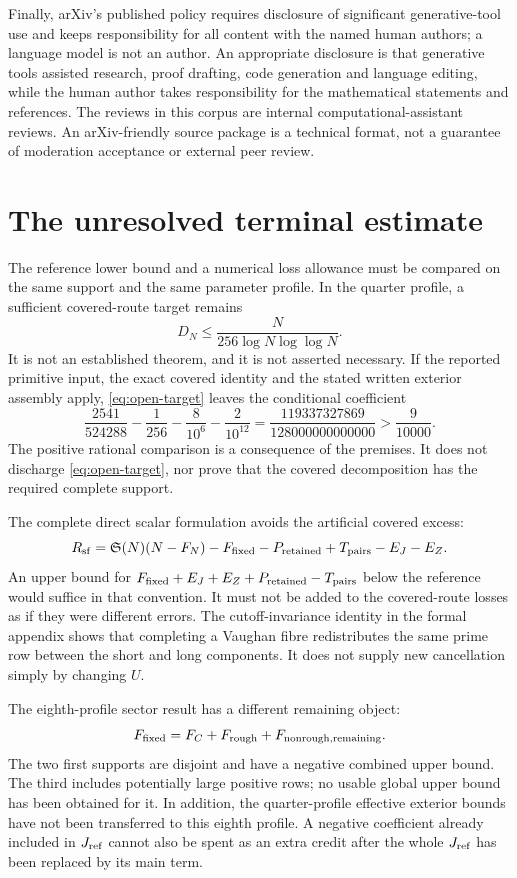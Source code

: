 \documentclass[11pt,a4paper]{article}
\theoremstyle{definition}
\theoremstyle{remark}
\newcommand{\Sing}{\mathfrak S}
\begin{document}
Finally, arXiv's published policy \cite{arxivpolicy} requires disclosure
of significant generative-tool use and keeps responsibility for all
content with the named human authors; a language model is not an author.
An appropriate disclosure is that generative tools assisted research,
proof drafting, code generation and language editing, while the human
author takes responsibility for the mathematical statements and references.
The reviews in this corpus are internal computational-assistant reviews.
An arXiv-friendly source package is a technical format, not a guarantee
of moderation acceptance or external peer review.


\section{The unresolved terminal estimate}\label{sec:open}
The reference lower bound and a numerical loss allowance must be compared on the same support and the same parameter profile. In the quarter profile, a sufficient covered-route target remains
\begin{equation}\label{eq:open-target}
 D_N\le\frac{N}{256\log N\log\log N}.
\end{equation}
It is not an established theorem, and it is not asserted necessary. If the reported primitive input, the exact covered identity and the stated written exterior assembly apply, \eqref{eq:open-target} leaves the conditional coefficient
\[\frac{2541}{524288}-\frac1{256}-\frac8{10^6}-\frac2{10^{12}}
 =\frac{119337327869}{128000000000000}>\frac9{10000}.
\]
The positive rational comparison is a consequence of the premises. It does not discharge \eqref{eq:open-target}, nor prove that the covered decomposition has the required complete support.

The complete direct scalar formulation avoids the artificial covered excess:
\[R_{\rm sf}=\Sing(N)(N-F_N)-F_{\rm fixed}-P_{\rm retained}
 +T_{\rm pairs}-E_J-E_Z.\]
An upper bound for $F_{\rm fixed}+E_J+E_Z+P_{\rm retained}-T_{\rm pairs}$ below the reference would suffice in that convention. It must not be added to the covered-route losses as if they were different errors. The cutoff-invariance identity in the formal appendix shows that completing a Vaughan fibre redistributes the same prime row between the short and long components. It does not supply new cancellation simply by changing $U$.

The eighth-profile sector result has a different remaining object:
\[F_{\rm fixed}=F_C+F_{\rm rough}+F_{\rm nonrough,remaining}.
\]
The two first supports are disjoint and have a negative combined upper bound. The third includes potentially large positive rows; no usable global upper bound has been obtained for it. In addition, the quarter-profile effective exterior bounds have not been transferred to this eighth profile. A negative coefficient already included in $J_{\rm ref}$ cannot also be spent as an extra credit after the whole $J_{\rm ref}$ has been replaced by its main term.
\end{document}
